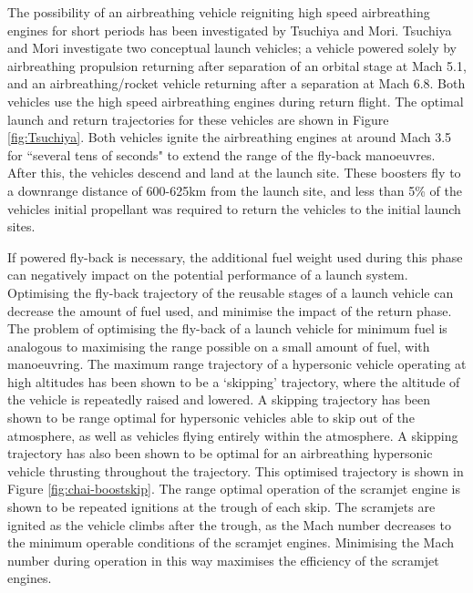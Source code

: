 The possibility of an airbreathing vehicle reigniting high speed airbreathing engines for short periods has been investigated by Tsuchiya and Mori\cite{Tsuchiya2005}.  Tsuchiya and Mori investigate two conceptual launch vehicles; a vehicle powered solely by airbreathing propulsion returning after separation of an orbital stage at Mach 5.1, and an airbreathing/rocket vehicle returning after a separation at Mach 6.8\cite{Tsuchiya2005}.  Both vehicles use the high speed airbreathing engines during return flight. The optimal launch and return trajectories for these vehicles are shown in Figure \ref{fig:Tsuchiya}. Both vehicles ignite the airbreathing engines at around Mach 3.5 for ``several tens of seconds" to extend the range of the fly-back manoeuvres. After this, the vehicles descend and land at the launch site. 
These boosters fly to a downrange distance of 600-625km from the launch site, and less than 5\% of the vehicles initial propellant was required to return the vehicles to the initial launch sites\cite{Tsuchiya2005}.

If powered fly-back is necessary, the additional fuel weight used during this phase can negatively impact on the potential performance of a launch system. 
Optimising the fly-back trajectory of the reusable stages of a launch vehicle can decrease the amount of fuel used, and minimise the impact of the return phase. 
 The problem of optimising the fly-back of a launch vehicle for minimum fuel is analogous to maximising the range possible on a small amount of fuel, with manoeuvring. The maximum range trajectory of a hypersonic vehicle operating at high altitudes has been shown to be a `skipping' trajectory, where the altitude of the vehicle is repeatedly raised and lowered\cite{Moshman2014,Darby2011,Toso2015,Chai2015}. A skipping trajectory has been shown to be range optimal for hypersonic vehicles able to skip out of the atmosphere\cite{Eggers1957,Moshman2014}, as well as vehicles flying entirely within the atmosphere\cite{Moshman2014,Darby2011,Toso2015,Tetlow1992}. A skipping trajectory has also been shown to be optimal for an airbreathing hypersonic vehicle thrusting throughout the trajectory\cite{Kanda2007,Chai2015}. This optimised trajectory is shown in Figure \ref{fig:chai-boostskip}. The range optimal operation of the scramjet engine is shown to be repeated ignitions at the trough of each skip\cite{Chai2015}. The scramjets are ignited as the vehicle climbs after the trough, as the Mach number decreases to the minimum operable conditions of the scramjet engines\cite{Chai2015}. Minimising the Mach number during operation in this way maximises the efficiency of the scramjet engines\cite{Chai2015}.
 
